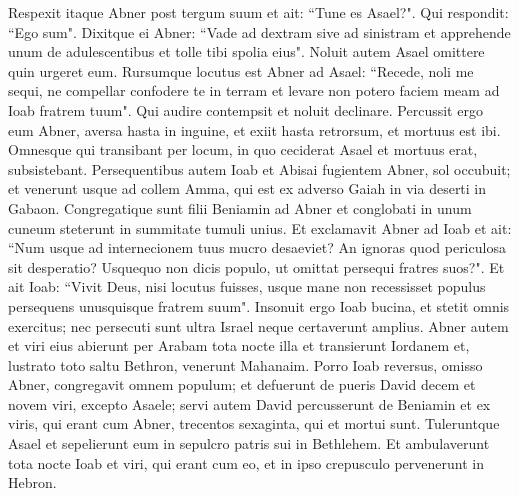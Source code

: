 \begin{biblechapter}
\verse Respexit itaque Abner post tergum suum et ait: “Tune es Asael?". Qui respondit: “Ego sum". 
\verse Dixitque ei Abner: “Vade ad dextram sive ad sinistram et apprehende unum de adulescentibus et tolle tibi spolia eius". Noluit autem Asael omittere quin urgeret eum. 
\verse Rursumque locutus est Abner ad Asael: “Recede, noli me sequi, ne compellar confodere te in terram et levare non potero faciem meam ad Ioab fratrem tuum". 
\verse Qui audire contempsit et noluit declinare. Percussit ergo eum Abner, aversa hasta in inguine, et exiit hasta retrorsum, et mortuus est ibi. Omnesque qui transibant per locum, in quo ceciderat Asael et mortuus erat, subsistebant. 
\verse Persequentibus autem Ioab et Abisai fugientem Abner, sol occubuit; et venerunt usque ad collem Amma, qui est ex adverso Gaiah in via deserti in Gabaon. 
\verse Congregatique sunt filii Beniamin ad Abner et conglobati in unum cuneum steterunt in summitate tumuli unius. 
\verse Et exclamavit Abner ad Ioab et ait: “Num usque ad internecionem tuus mucro desaeviet? An ignoras quod periculosa sit desperatio? Usquequo non dicis populo, ut omittat persequi fratres suos?". 
\verse Et ait Ioab: “Vivit Deus, nisi locutus fuisses, usque mane non recessisset populus persequens unusquisque fratrem suum". 
\verse Insonuit ergo Ioab bucina, et stetit omnis exercitus; nec persecuti sunt ultra Israel neque certaverunt amplius. 
\verse Abner autem et viri eius abierunt per Arabam tota nocte illa et transierunt Iordanem et, lustrato toto saltu Bethron, venerunt Mahanaim. 
\verse Porro Ioab reversus, omisso Abner, congregavit omnem populum; et defuerunt de pueris David decem et novem viri, excepto Asaele;  
\verse servi autem David percusserunt de Beniamin et ex viris, qui erant cum Abner, trecentos sexaginta, qui et mortui sunt. 
\verse Tuleruntque Asael et sepelierunt eum in sepulcro patris sui in Bethlehem. Et ambulaverunt tota nocte Ioab et viri, qui erant cum eo, et in ipso crepusculo pervenerunt in Hebron. 
\end{biblechapter}

